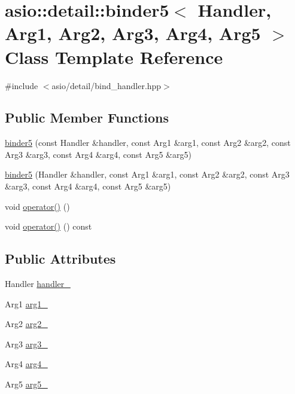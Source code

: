\hypertarget{classasio_1_1detail_1_1binder5}{}\section{asio\+:\+:detail\+:\+:binder5$<$ Handler, Arg1, Arg2, Arg3, Arg4, Arg5 $>$ Class Template Reference}
\label{classasio_1_1detail_1_1binder5}


{\ttfamily \#include $<$asio/detail/bind\+\_\+handler.\+hpp$>$}

\subsection*{Public Member Functions}
\begin{DoxyCompactItemize}
\item 
\hyperlink{classasio_1_1detail_1_1binder5_a22d2ba2f325ac7a48a0da817ce109c19}{binder5} (const Handler \&handler, const Arg1 \&arg1, const Arg2 \&arg2, const Arg3 \&arg3, const Arg4 \&arg4, const Arg5 \&arg5)
\item 
\hyperlink{classasio_1_1detail_1_1binder5_a038ec22c54f92390e9d4640b885387e2}{binder5} (Handler \&handler, const Arg1 \&arg1, const Arg2 \&arg2, const Arg3 \&arg3, const Arg4 \&arg4, const Arg5 \&arg5)
\item 
void \hyperlink{classasio_1_1detail_1_1binder5_ad966ce26cc08544566381a4908543b50}{operator()} ()
\item 
void \hyperlink{classasio_1_1detail_1_1binder5_a34391c3236545bb1e0353770da9b942b}{operator()} () const 
\end{DoxyCompactItemize}
\subsection*{Public Attributes}
\begin{DoxyCompactItemize}
\item 
Handler \hyperlink{classasio_1_1detail_1_1binder5_a9dd44f3c00833f6ce5971abb8b5c65ee}{handler\+\_\+}
\item 
Arg1 \hyperlink{classasio_1_1detail_1_1binder5_a319c9b9ff436b5be8fe9c165704d9c0c}{arg1\+\_\+}
\item 
Arg2 \hyperlink{classasio_1_1detail_1_1binder5_a28218bc27a6737279e464b94b7ef14f0}{arg2\+\_\+}
\item 
Arg3 \hyperlink{classasio_1_1detail_1_1binder5_a801f94834f9fc7a264e0df6adda829d5}{arg3\+\_\+}
\item 
Arg4 \hyperlink{classasio_1_1detail_1_1binder5_aae101215d4ab2e438ae9b8c05e4146a9}{arg4\+\_\+}
\item 
Arg5 \hyperlink{classasio_1_1detail_1_1binder5_a474dc3cb26a028ffd5fd6477592c64aa}{arg5\+\_\+}
\end{DoxyCompactItemize}



